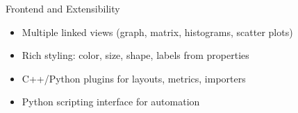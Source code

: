 \begin{frame}{Frontend and Extensibility}
	\begin{itemize}
		\item Multiple linked views (graph, matrix, histograms, scatter plots)
		\item Rich styling: color, size, shape, labels from properties
		\item C++/Python plugins for layouts, metrics, importers
		\item Python scripting interface for automation
	\end{itemize}
\end{frame}